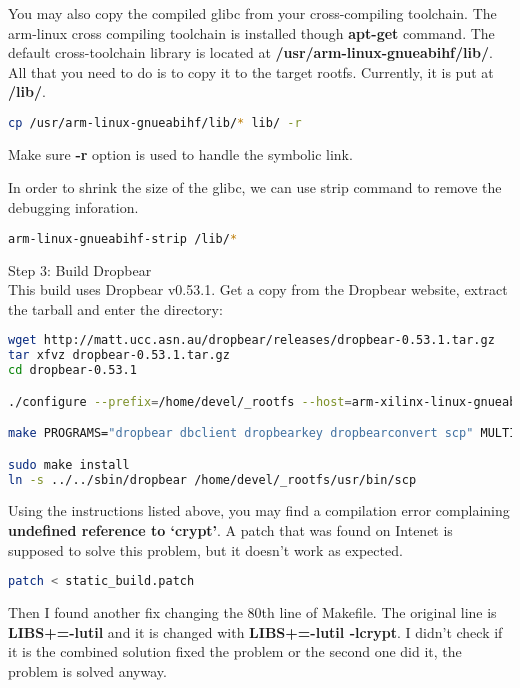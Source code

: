 \documentclass[12pt]{article} %
\begin{document}
You may also copy the compiled glibc from your cross-compiling toolchain. 
The arm-linux cross compiling toolchain is installed though \textbf{apt-get} command.
The default cross-toolchain library is located at \textbf{/usr/arm-linux-gnueabihf/lib/}.
All that you need to do is to copy it to the target rootfs. Currently, 
it is put at \textbf{/lib/}.

\begin{lstlisting}[language=bash]
cp /usr/arm-linux-gnueabihf/lib/* lib/ -r
\end{lstlisting}
Make sure \textbf{-r} option is used to handle the symbolic link.

In order to shrink the size of the glibc, we can use strip command to remove the debugging inforation.
\begin{lstlisting}[language=bash]
arm-linux-gnueabihf-strip /lib/*
\end{lstlisting}

Step 3: Build Dropbear \\
This build uses Dropbear v0.53.1.
Get a copy from the Dropbear website, extract the tarball and enter the directory:

\begin{lstlisting}[language=bash]
wget http://matt.ucc.asn.au/dropbear/releases/dropbear-0.53.1.tar.gz
tar xfvz dropbear-0.53.1.tar.gz
cd dropbear-0.53.1

./configure --prefix=/home/devel/_rootfs --host=arm-xilinx-linux-gnueabi --disable-zlib CC=arm-xilinx-linux-gnueabi-gcc LDFLAGS="-Wl,--gc-sections" CFLAGS="-ffunction-sections -fdata-sections -Os"

make PROGRAMS="dropbear dbclient dropbearkey dropbearconvert scp" MULTI=1 strip

sudo make install
ln -s ../../sbin/dropbear /home/devel/_rootfs/usr/bin/scp
\end{lstlisting}
Using the instructions listed above, you may find a compilation error complaining \textbf{undefined reference to `crypt'}.
A patch that was found on Intenet is supposed to solve this problem, but it doesn't work as expected. 
\begin{lstlisting}[language=bash]
patch < static_build.patch
\end{lstlisting}
Then I found another fix changing the 80th line of Makefile.
The original line is \textbf{LIBS+=-lutil} and it is changed with \textbf{LIBS+=-lutil -lcrypt}.
I didn't check if it is the combined solution fixed the problem or the second one did it, the problem is solved anyway.
\end{document}
